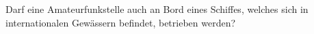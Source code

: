 \documentclass[12pt,a4paper,ngerman]{article}
\theoremstyle{definition}
\theoremstyle{plain}
\theoremstyle{mytheorem}
\theoremstyle{definition}
\begin{document}
    \begin{tikzpicture}[scale=1]
        
    \end{tikzpicture}




Darf eine Amateurfunkstelle auch an Bord eines Schiffes, welches sich in internationalen Gewässern befindet, betrieben werden?


%

%
%

\begin{description}

\end{description}




%
\end{document}

